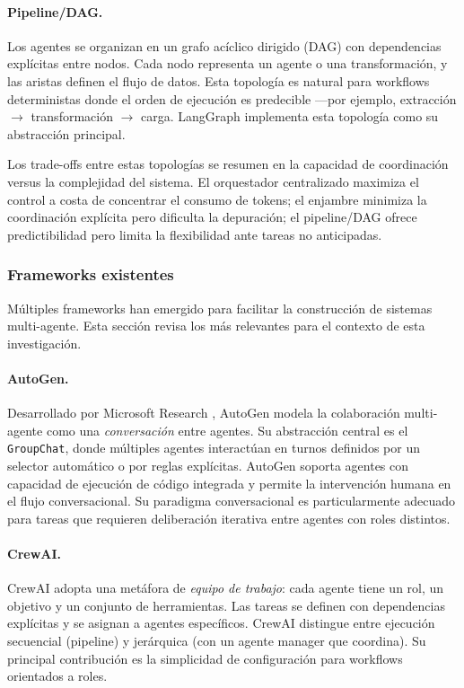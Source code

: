 \paragraph{Pipeline/DAG.} Los agentes se organizan en un grafo acíclico
dirigido (DAG) con dependencias explícitas entre nodos. Cada nodo representa un
agente o una transformación, y las aristas definen el flujo de datos. Esta
topología es natural para workflows deterministas donde el orden de ejecución
es predecible ---por ejemplo, extracción $\rightarrow$ transformación
$\rightarrow$ carga. LangGraph \citep{langgraph2024} implementa esta topología
como su abstracción principal.

Los trade-offs entre estas topologías se resumen en la capacidad de
coordinación versus la complejidad del sistema. El orquestador centralizado
maximiza el control a costa de concentrar el consumo de tokens; el enjambre
minimiza la coordinación explícita pero dificulta la depuración; el
pipeline/DAG ofrece predictibilidad pero limita la flexibilidad ante tareas
no anticipadas.

\subsubsection{Frameworks existentes}

Múltiples frameworks han emergido para facilitar la construcción de sistemas
multi-agente. Esta sección revisa los más relevantes para el contexto de esta
investigación.

\paragraph{AutoGen.} Desarrollado por Microsoft Research \citep{autogen2023wu},
AutoGen modela la colaboración multi-agente como una \textit{conversación} entre
agentes. Su abstracción central es el \texttt{GroupChat}, donde múltiples
agentes interactúan en turnos definidos por un selector automático o por reglas
explícitas. AutoGen soporta agentes con capacidad de ejecución de código
integrada y permite la intervención humana en el flujo conversacional. Su
paradigma conversacional es particularmente adecuado para tareas que requieren
deliberación iterativa entre agentes con roles distintos.

\paragraph{CrewAI.} CrewAI \citep{crewai2024} adopta una metáfora de
\textit{equipo de trabajo}: cada agente tiene un rol, un objetivo y un conjunto
de herramientas. Las tareas se definen con dependencias explícitas y se asignan
a agentes específicos. CrewAI distingue entre ejecución secuencial (pipeline) y
jerárquica (con un agente manager que coordina). Su principal contribución es la
simplicidad de configuración para workflows orientados a roles.

